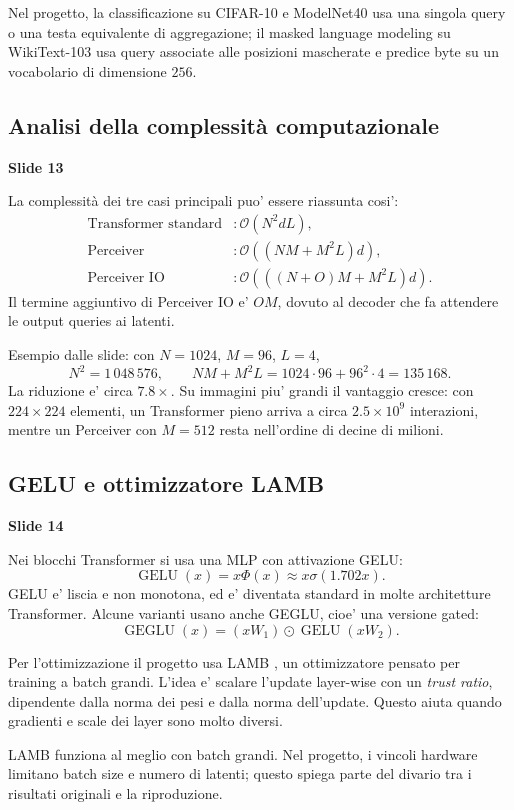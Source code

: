 \documentclass[11pt,a4paper]{article}
\newcommand{\bigO}{\mathcal{O}}
\newcommand{\slide}[1]{\textcolor{mainblue}{\textbf{Slide #1}}}
\begin{document}
Nel progetto, la classificazione su CIFAR-10 e ModelNet40 usa una singola query
o una testa equivalente di aggregazione; il masked language modeling su
WikiText-103 usa query associate alle posizioni mascherate e predice byte su un
vocabolario di dimensione $256$.

\subsection{Analisi della complessit\`a computazionale}
\slide{13}

La complessit\`a dei tre casi principali puo' essere riassunta cosi':
\[
\begin{aligned}
  \text{Transformer standard} &: \bigO(N^2 d L),\\
  \text{Perceiver} &: \bigO((NM + M^2L)d),\\
  \text{Perceiver IO} &: \bigO(((N+O)M + M^2L)d).
\end{aligned}
\]
Il termine aggiuntivo di Perceiver IO e' $OM$, dovuto al decoder che fa
attendere le output queries ai latenti.

Esempio dalle slide: con $N=1024$, $M=96$, $L=4$,
\[
  N^2 = 1\,048\,576,
  \qquad
  NM + M^2L = 1024 \cdot 96 + 96^2 \cdot 4 = 135\,168.
\]
La riduzione e' circa $7.8\times$. Su immagini piu' grandi il vantaggio cresce:
con $224 \times 224$ elementi, un Transformer pieno arriva a circa
$2.5 \times 10^9$ interazioni, mentre un Perceiver con $M=512$ resta nell'ordine
di decine di milioni.

\subsection{GELU e ottimizzatore LAMB}
\slide{14}

Nei blocchi Transformer si usa una MLP con attivazione GELU:
\[
  \operatorname{GELU}(x) = x \Phi(x)
  \approx x \sigma(1.702x).
\]
GELU e' liscia e non monotona, ed e' diventata standard in molte architetture
Transformer. Alcune varianti usano anche GEGLU, cioe' una versione gated:
\[
  \operatorname{GEGLU}(x)
  =
  (xW_1) \odot \operatorname{GELU}(xW_2).
\]

Per l'ottimizzazione il progetto usa LAMB \cite{you2020lamb}, un ottimizzatore
pensato per training a batch grandi. L'idea e' scalare l'update layer-wise con
un \emph{trust ratio}, dipendente dalla norma dei pesi e dalla norma
dell'update. Questo aiuta quando gradienti e scale dei layer sono molto diversi.

\begin{riskBox}
LAMB funziona al meglio con batch grandi. Nel progetto, i vincoli hardware
limitano batch size e numero di latenti; questo spiega parte del divario tra i
risultati originali e la riproduzione.
\end{riskBox}
\end{document}
